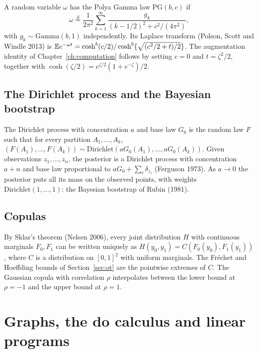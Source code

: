 A random variable $\omega$ has the Polya Gamma law $\mathrm{PG}(b, c)$ if
\[
\omega \overset{d}{=} \frac{1}{2\pi^2}\sum_{k=1}^\infty \frac{g_k}{(k - 1/2)^2 + c^2/(4\pi^2)},
\]
with $g_k \sim \mathrm{Gamma}(b, 1)$ independently.
Its Laplace transform (Polson, Scott and Windle 2013) is $\mathbb{E} e^{-\omega t} = \cosh^b(c/2)/\cosh^b\{\sqrt{(c^2/2 + t)/2}\}$. The augmentation identity of Chapter~\ref{ch:computation} follows by setting $c = 0$ and $t = \zeta^2/2$, together with $\cosh(\zeta/2) = e^{\zeta/2}(1 + e^{-\zeta})/2$.

\subsection{The Dirichlet process and the Bayesian bootstrap}

The Dirichlet process with concentration $a$ and base law $G_0$ is the random law $F$ such that for every partition $A_1, \ldots, A_k$, $(F(A_1), \ldots, F(A_k)) \sim \mathrm{Dirichlet}(aG_0(A_1), \ldots, aG_0(A_k))$. Given observations $z_1, \ldots, z_n$, the posterior is a Dirichlet process with concentration $a + n$ and base law proportional to $aG_0 + \sum_i\delta_{z_i}$ (Ferguson 1973). As $a \to 0$ the posterior puts all its mass on the observed points, with weights $\mathrm{Dirichlet}(1, \ldots, 1)$: the Bayesian bootstrap of Rubin (1981).

\subsection{Copulas}

By Sklar's theorem (Nelsen 2006), every joint distribution $H$ with continuous marginals $F_0, F_1$ can be written uniquely as $H(y_0, y_1) = C(F_0(y_0), F_1(y_1))$, where $C$ is a distribution on $[0,1]^2$ with uniform marginals. The Fr\'echet and Hoeffding bounds of Section~\ref{sec:ot} are the pointwise extremes of $C$.  The Gaussian copula with correlation $\rho$ interpolates between the lower bound at $\rho = -1$ and the upper bound at $\rho = 1$.

\section{Graphs, the do calculus and linear programs}\label{app:graphs}


